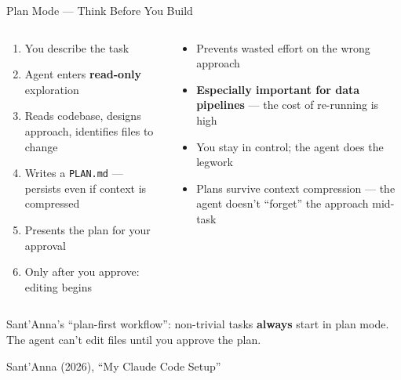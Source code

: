 \documentclass[aspectratio=169, 11pt]{beamer}
\newcommand{\emphgold}[1]{\alert{\textbf{#1}}}
\newcommand{\sourceref}[1]{\vspace{0.15cm}\hfill{\tiny\textcolor{medgray}{#1}}}
\begin{document}
\begin{frame}[shrink=26]{Plan Mode --- Think Before You Build}
\begin{columns}[T]
\begin{keyinsight}
\begin{enumerate}
  \item You describe the task
  \item Agent enters \emphgold{read-only} exploration
  \item Reads codebase, designs approach, identifies files to change
  \item Writes a \texttt{PLAN.md} --- persists even if context is compressed
  \item Presents the plan for your approval
  \item Only after you approve: editing begins
\end{enumerate}
\end{keyinsight}

\begin{keyinsight}
\begin{itemize}
  \item Prevents wasted effort on the wrong approach
  \item \emphgold{Especially important for data pipelines} --- the cost of re-running is high
  \item You stay in control; the agent does the legwork
  \item Plans survive context compression --- the agent doesn't ``forget'' the approach mid-task
\end{itemize}
\end{keyinsight}
\end{columns}
\vspace{0.1cm}
\begin{bigquote}
Sant'Anna's ``plan-first workflow'': non-trivial tasks \emphgold{always} start in plan mode. The agent can't edit files until you approve the plan.
\end{bigquote}
\sourceref{Sant'Anna (2026), ``My Claude Code Setup''}
\end{frame}
\end{document}
